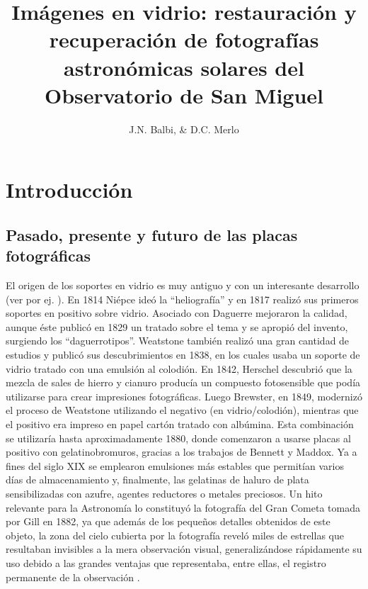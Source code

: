 \documentclass[baaa]{baaa}
\title{Imágenes en vidrio: restauración y recuperación de fotografías astronómicas solares del Observatorio de San Miguel}
\author{
J.N. Balbi\inst{1},
\&
D.C. Merlo\inst{2}
}
\institute{
Museo Lic. Gustavo Rodríguez, Observatorio de Física Cósmica Padre Bussolini, Argentina
\and
Museo del Observatorio Astronómico de Córdoba, UNC, Argentina
}
\begin{document}
\maketitle
\section{Introducci\'on}\label{intro}
\subsection{Pasado, presente y futuro de las placas fotográficas}\label{intro_a}
El origen de los soportes en vidrio es muy antiguo y con un interesante desarrollo (ver por ej. \citealp{Rose2007}). En 1814 Niépce ideó la ``heliografía'' y en 1817 realizó sus primeros
soportes en positivo sobre vidrio. Asociado con Daguerre mejoraron la calidad, aunque éste publicó en 1829 un tratado sobre el tema y se apropió del invento, surgiendo los ``daguerrotipos''.
Weatstone también realizó una gran cantidad de estudios y publicó sus descubrimientos en 1838, en los cuales usaba un soporte de vidrio tratado con una emulsión al colodión.
En 1842, Herschel descubrió que la mezcla de sales de hierro y cianuro producía un compuesto fotosensible que podía utilizarse para crear impresiones fotográficas. 
Luego Brewster, en 1849, modernizó el proceso de Weatstone utilizando el negativo (en vidrio/colodión), mientras que el positivo era impreso en papel cartón tratado con albúmina.
Esta combinación se utilizaría hasta aproximadamente 1880, donde comenzaron a usarse placas al positivo con gelatinobromuros, gracias a los trabajos de Bennett y Maddox.
Ya a fines del siglo XIX se emplearon emulsiones más estables que permitían varios días de almacenamiento y, finalmente, las gelatinas de haluro de plata sensibilizadas con azufre, agentes reductores o metales preciosos.
Un hito relevante para la Astronomía lo constituyó la fotografía del Gran Cometa tomada por Gill en 1882, ya que además de los pequeños detalles obtenidos de este objeto, la zona del cielo cubierta por la fotografía reveló miles de estrellas que resultaban invisibles a la mera observación visual, generalizándose rápidamente su uso debido a las grandes ventajas que representaba, entre ellas, el registro permanente de la observación \citep{Bachiller2009}.
\end{document}
